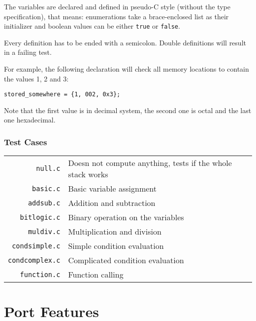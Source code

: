             The variables are declared and defined in pseudo-C style (without the type specification), that means: enumerations take a brace-enclosed list as their initializer and boolean values can be either \texttt{true} or \texttt{false}.

            Every definition has to be ended with a semicolon. Double definitions will result in a failing test.

            For example, the following declaration will check all memory locations to contain the values 1, 2 and 3:

            \begin{center}
                \texttt{stored\_somewhere = \{1, 002, 0x3\};}
            \end{center}

            Note that the first value is in decimal system, the second one is octal and the last one hexadecimal.

        \subsection{Test Cases}

            \begin{center}
            \begin{tabular}{ r | l }
                \texttt{null.c} & Doesn not compute anything, tests if the whole stack works \\
                \texttt{basic.c} & Basic variable assignment \\
                \texttt{addsub.c} & Addition and subtraction \\
                \texttt{bitlogic.c} & Binary operation on the variables \\
                \texttt{muldiv.c} & Multiplication and division \\
                \texttt{condsimple.c} & Simple condition evaluation \\
                \texttt{condcomplex.c} & Complicated condition evaluation \\
                \texttt{function.c} & Function calling \\
            \end{tabular}
            \end{center}

\chapter{Port Features}\label{features}

